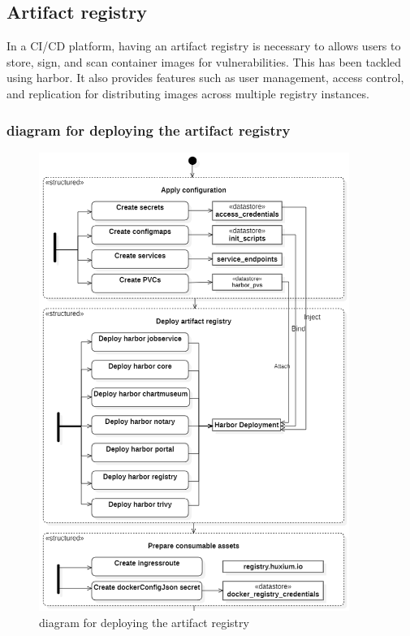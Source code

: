 \subsection{Artifact registry }

In a CI/CD platform, having an artifact registry is necessary to allows users to store, sign, and scan container images for vulnerabilities. This has been tackled using harbor. It also provides features such as user management, access control, and replication for distributing images across multiple registry instances. 

\subsubsection{diagram for deploying the artifact registry}

\begin{figure}[H]\centering
\includegraphics[width=0.9\textwidth,angle=00]{assets/f39.png}
\caption{diagram for deploying the artifact registry }
\label{fig:diagram for deploying the artifact registry}
\end{figure}

